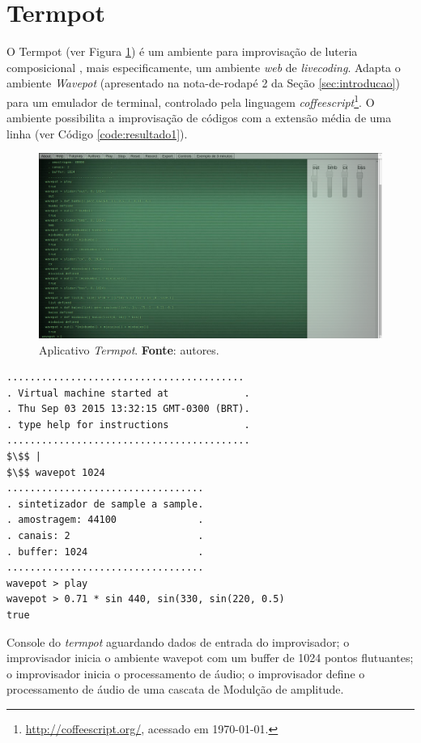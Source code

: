 \section{Termpot}\label{sec:termpot}

O Termpot (ver Figura \ref{fig:termpot}) é um ambiente para improvisação de luteria composicional \cite{iazzetta_musica_2009,soares_luteria_2015}, mais especificamente, um ambiente \emph{web} de \emph{livecoding}. Adapta o ambiente \emph{Wavepot} (apresentado na nota-de-rodapé 2 da Seção \ref{sec:introducao}) para um emulador de terminal, controlado pela linguagem \emph{coffeescript}\cite{burnham2011coffeescript}\footnote{\url{http://coffeescript.org/}, acessado em \today.}. O ambiente possibilita a improvisação de códigos com a extensão média de uma linha (ver Código \ref{code:resultado1}). 

\begin{figure}[!h]
\centering
\includegraphics[scale=0.35]{termpot.png}
\caption{Aplicativo \emph{Termpot}. \textbf{Fonte}: autores.}
\label{fig:termpot}
\end{figure}

\begin{listing}
\begin{verbatim}
.........................................
. Virtual machine started at             .
. Thu Sep 03 2015 13:32:15 GMT-0300 (BRT).
. type help for instructions             .
..........................................
$\$$ |
$\$$ wavepot 1024
..................................
. sintetizador de sample a sample. 
. amostragem: 44100              .
. canais: 2                      .
. buffer: 1024                   .
..................................
wavepot > play
wavepot > 0.71 * sin 440, sin(330, sin(220, 0.5)
true
\end{verbatim}
\caption{Console do \emph{termpot} aguardando dados de entrada do improvisador; o improvisador inicia o ambiente wavepot com um buffer de 1024 pontos flutuantes; o improvisador inicia o processamento de áudio; o improvisador define o processamento de áudio de uma cascata de Modulção de amplitude.}
\label{code:resultado1}
\end{listing}


